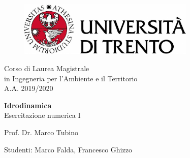 \documentclass[12pt]{article} %
\begin{document}
	

\thispagestyle{empty} %
{\linespread{2.3}\selectfont
{\sffamily
	\begin{figure}
		\centering
		\includegraphics[width=0.75\textwidth]{logounitrento2019.jpg}
	\end{figure}
		
	\vspace*{-1.5em}
		
	\begin{center}
		{\Large Corso di Laurea Magistrale}\\
		\vspace*{-0.8em}
		{\Large in Ingegneria per l'Ambiente e il Territorio}\\
		\vspace*{0.5em}
		{\Large A.A. 2019/2020}
				
		\vspace*{4em}
		
		{\Huge \textbf{Idrodinamica}}\\{\Large Esercitazione numerica I }
		
		\vspace*{4em}
		
		{\Large Prof. Dr. Marco Tubino}
	\end{center}
	
	\vspace*{3.2em}
	
	\begin{center}
	{\large
		Studenti:
	}
	{\large
		Marco Falda, Francesco Ghizzo
	}
	\end{center}

}
}
\restoregeometry
\end{document}
